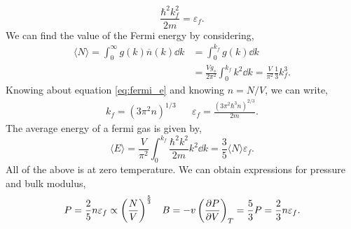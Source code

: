 \documentclass{book}
\begin{document}
\begin{equation}
	\frac{\hbar^2k_f^2}{2m} = \varepsilon_f. \label{eq:fermi_e}
\end{equation}
We can find the value of the Fermi energy by considering,
\begin{equation}
	\begin{split}
		\langle N \rangle = \int_0^{\infty}g(k) \overline{n}(k)\dd{k} &= \int_0^{k_f}g(k)\dd{k} \\
		& = \frac{Vg_s}{2\pi^2}\int_0^{k_f}k^2\dd{k} = \frac{V}{\pi^2}\frac{1}{3}k_f^3.
	\end{split}
\end{equation}
Knowing about equation \eqref{eq:fermi_e} and knowing $n = N/V$, we can write,
\begin{align}
	k_f = (3\pi^2n)^{1/3} && \varepsilon_f = \frac{(3\pi^2\hbar^3n)^{2/3}}{2m}.
\end{align}
The average energy of a fermi gas is given by,
\begin{equation}
	\langle E \rangle  = \frac{V}{\pi^2}\int_0^{k_f}\frac{\hbar^2k^2}{2m}k^2\dd{k} = \frac{3}{5}\langle N \rangle \varepsilon_f.
\end{equation}
All of the above is at zero temperature. We can obtain expressions for pressure and bulk modulus,
\begin{align}
	P=\frac{2}{5}n\varepsilon_f\propto\left(\frac{N}{V}\right)^{\frac{5}{3}} && B = -v\left(\pdv{P}{V}\right)_{T} = \frac{5}{3}P = \frac{2}{3}n\varepsilon_f.
\end{align}
\end{document}
